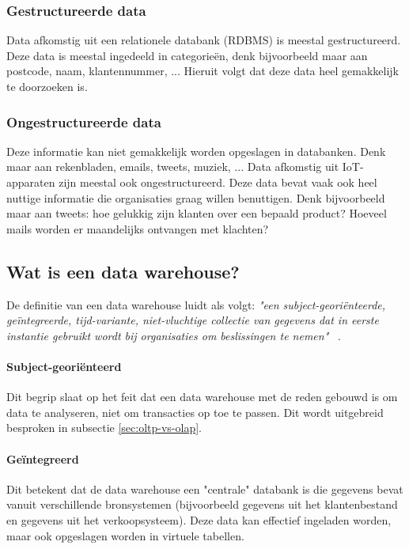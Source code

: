 \subsubsection{Gestructureerde data}
Data afkomstig uit een relationele databank (RDBMS) is meestal gestructureerd. Deze data is meestal ingedeeld in categorieën, denk bijvoorbeeld maar aan postcode, naam, klantennummer, ... Hieruit volgt dat deze data heel gemakkelijk te doorzoeken is. 

\subsubsection{Ongestructureerde data}
Deze informatie kan niet gemakkelijk worden opgeslagen in databanken. Denk maar aan rekenbladen, emails, tweets, muziek, ... Data afkomstig uit IoT-apparaten zijn meestal ook ongestructureerd. Deze data bevat vaak ook heel nuttige informatie die organisaties graag willen benuttigen. Denk bijvoorbeeld maar aan tweets: hoe gelukkig zijn klanten over een bepaald product? Hoeveel mails worden er maandelijks ontvangen met klachten?

\subsection{Wat is een data warehouse?}
De definitie van een data warehouse luidt als volgt: \textit{"een subject-georiënteerde, geïntegreerde, tijd-variante, niet-vluchtige collectie van gegevens dat in eerste instantie gebruikt wordt bij organisaties om beslissingen te nemen"} ~\autocite{Panos2000}.

\paragraph{Subject-georiënteerd}
Dit begrip slaat op het feit dat een data warehouse met de reden gebouwd is om data te analyseren, niet om transacties op toe te passen. Dit wordt uitgebreid besproken in subsectie \ref{sec:oltp-vs-olap}.


\paragraph{Geïntegreerd}
Dit betekent dat de data warehouse een "centrale" databank is die gegevens bevat vanuit verschillende bronsystemen (bijvoorbeeld gegevens uit het klantenbestand en gegevens uit het verkoopsysteem). Deze data kan effectief ingeladen worden, maar ook opgeslagen worden in virtuele tabellen.

